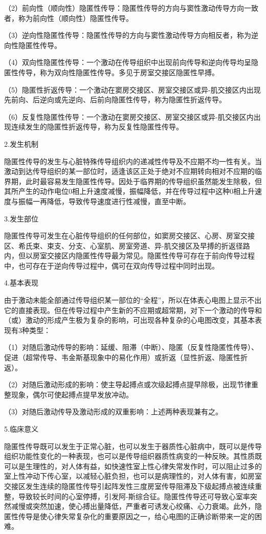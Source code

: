 （2）前向性（顺向性）隐匿性传导：隐匿性传导的方向与窦性激动传导方向一致者，称为前向性（顺向性）隐匿性传导。

（3）逆向性隐匿性传导：隐匿性传导的方向与窦性激动传导方向相反者，称为逆向性隐匿性传导。

（4）双向性隐匿性传导：一个激动在传导组织中出现前向传导和逆向传导均呈隐匿性传导，称为双向性隐匿性传导。多见于房室交接区隐匿性早搏。

（5）隐匿性折返传导：一个激动在窦房交接区、房室交接区或异-肌交接区内出现先前向、后逆向或先逆向、后前向隐匿性传导，称为隐匿性折返传导。

（6）反复性隐匿性传导：一个激动在窦房交接区、房室交接区或异-肌交接区内出现连续发生的隐匿性折返传导，称为反复性隐匿性传导。

2.发生机制

隐匿性传导的发生与心脏特殊传导组织内的递减性传导及不应期不均一性有关。当激动到达传导组织的某一部位时，适逢该区正处于绝对不应期转向相对不应期的临界期，此时最容易发生隐匿性传导。因处于临界期的传导组织虽然能发生除极，但其所产生的动作电位0相上升速度减慢，振幅降低，并在传导过程中这种0相上升速度与振幅一再降低，导致传导速度进行性减慢，直至中断。

3.发生部位

隐匿性传导可发生在心脏传导组织的任何部位，如窦房交接区、心房、房室交接区、希氏束、束支、分支、心室肌、房室旁道、异-肌交接区及早搏的折返径路内，但以房室交接区内隐匿性传导最为常见。隐匿性传导可存在于前向传导过程中，也可存在于逆向传导过程中，偶可在双向传导过程中同时出现。

4.基本表现

由于激动未能全部通过传导组织某一部位的“全程”，所以在体表心电图上显示不出它的直接表现。但在传导过程中产生新的不应期或超常期，对下一个激动的传导和（或）激动的形成产生极为复杂的影响，可出现各种复杂的心电图改变，其基本表现有3种类型：

（1）对随后激动传导的影响：延缓、阻滞（中断）、隐匿（反复性隐匿性传导）、促进（超常传导、韦金斯基现象中的易化作用）或折返（显性折返、隐匿性折返）。

（2）对随后激动形成的影响：使主导起搏点或次级起搏点提早除极，出现节律重整现象，偶尔可使起搏点提早发放冲动。

（3）对随后激动传导及激动形成的双重影响：上述两种表现兼有之。

5.临床意义

隐匿性传导既可以发生于正常心脏，也可以发生于器质性心脏病中，既可以是传导组织功能性变化的一种表现，也可以是传导组织器质性病变的一种反映。其性质既可以是生理性的，对人体有益，如快速性室上性心律失常发作时，可以阻止过多的室上性冲动下传心室，以减轻心脏负担，也可以是病理性的，对人体有害，如房室交接区发生连续的隐匿性传导引起阵发性三度房室传导阻滞及下级起搏点被连续重整，导致较长时间的心室停搏，引发阿-斯综合征。隐匿性传导还可导致心室率突然减慢或突然加速，使心搏出量降低，严重者可诱发心绞痛、心力衰竭。此外，隐匿性传导是使心律失常复杂化的重要原因之一，给心电图的正确诊断带来一定的困难。


